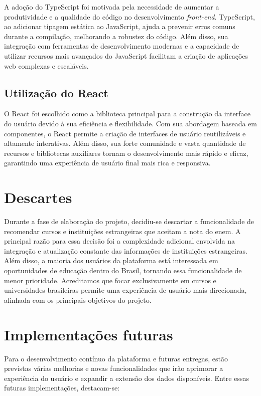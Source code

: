 A adoção do TypeScript foi motivada pela necessidade de aumentar a produtividade e a qualidade do código no desenvolvimento \textit{front-end}. TypeScript, ao adicionar tipagem estática ao JavaScript, ajuda a prevenir erros comuns durante a compilação, melhorando a robustez do código. Além disso, sua integração com ferramentas de desenvolvimento modernas e a capacidade de utilizar recursos mais avançados do JavaScript facilitam a criação de aplicações web complexas e escaláveis.

\subsection{Utilização do React}

O React foi escolhido como a biblioteca principal para a construção da interface do usuário devido à sua eficiência e flexibilidade. Com sua abordagem baseada em componentes, o React permite a criação de interfaces de usuário reutilizáveis e altamente interativas. Além disso, sua forte comunidade e vasta quantidade de recursos e bibliotecas auxiliares tornam o desenvolvimento mais rápido e eficaz, garantindo uma experiência de usuário final mais rica e responsiva.

\section{Descartes}

Durante a fase de elaboração do projeto, decidiu-se descartar a funcionalidade de recomendar cursos e instituições estrangeiras que aceitam a nota do \ac{enem}. A principal razão para essa decisão foi a complexidade adicional envolvida na integração e atualização constante das informações de instituições estrangeiras. Além disso, a maioria dos usuários da plataforma está interessada em oportunidades de educação dentro do Brasil, tornando essa funcionalidade de menor prioridade. Acreditamos que focar exclusivamente em cursos e universidades brasileiras permite uma experiência de usuário mais direcionada, alinhada com os principais objetivos do projeto.


\section{Implementações futuras}

Para o desenvolvimento contínuo da plataforma e futuras entregas, estão previstas várias melhorias e novas funcionalidades que irão aprimorar a experiência do usuário e expandir a extensão dos dados disponíveis. Entre essas futuras implementações, destacam-se:

